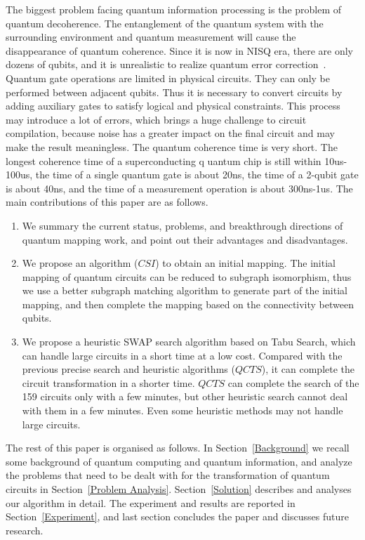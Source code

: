 \documentclass[runningheads]{llncs}
\begin{document}
The biggest problem facing quantum information processing is the problem of quantum decoherence.
The entanglement of the quantum system with the surrounding environment and quantum measurement 
will cause the disappearance of quantum coherence.
Since it is now in NISQ era, there are only dozens of qubits, 
and it is unrealistic to realize quantum error correction~\cite{2018QuantumPreskill}.
Quantum gate operations are limited in physical circuits. 
They can only be performed between adjacent qubits.
Thus it is necessary to convert circuits by adding auxiliary gates to satisfy logical and physical 
constraints. This process may introduce a lot of errors, 
which brings a huge challenge to circuit compilation, because noise has a greater impact on the 
final circuit and may make the result meaningless.
The quantum coherence time is very short. The longest coherence time of a superconducting q
uantum chip is still within 10us-100us, 
		the time of a single quantum gate is about 20ns, 
		the time of a 2-qubit gate is about 40ns, 
		and the time of a measurement operation is about 300ns-1us.
The main contributions of this paper are as follows.
	\begin{enumerate}
		\item We summary the current status, problems, and breakthrough directions 
		of quantum mapping work, and point out their advantages and disadvantages. 
		\item
		 We propose an algorithm ($CSI$) to obtain an initial mapping.
		 The initial mapping of quantum circuits can be reduced to subgraph isomorphism,
		 thus we use a better subgraph matching algorithm to generate part of the initial mapping, 
		 and then complete the mapping based on the connectivity between qubits.
		\item We propose a heuristic SWAP search algorithm based on Tabu Search, 
		which can handle large circuits in a short time at a low cost.
		Compared with the previous precise search and heuristic algorithms ($QCTS$),
		it can complete the circuit transformation in a shorter time.
		$QCTS$ can complete the search of the 159 circuits only with a few minutes, 
		but other heuristic search cannot deal with them in a few minutes.
		Even some heuristic methods may not handle large circuits.
	\end{enumerate}
	The rest of this paper is organised as follows. 
	In Section~\ref{Background} we recall some background of quantum computing and quantum information,
	and analyze the problems that need to be dealt with for the transformation of quantum circuits in Section~\ref{Problem Analysis}.
	Section~\ref{Solution} describes and analyses our algorithm in detail. 
	The experiment and results are reported in Section~\ref{Experiment}, 
	and last section concludes the paper and discusses future research.
\end{document}
